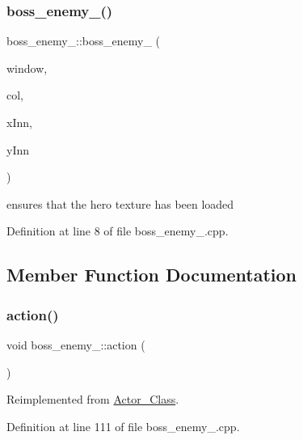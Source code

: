 \subsubsection{\texorpdfstring{boss\+\_\+enemy\+\_()}{boss\_enemy\_2()}}
{\footnotesize\ttfamily boss\+\_\+enemy\+\_\+::boss\+\_\+enemy\+\_ (\begin{DoxyParamCaption}\item[{sf\+::\+Render\+Window \&}]{window,  }\item[{\hyperlink{class_collision}{Collision}}]{col,  }\item[{int}]{x\+Inn,  }\item[{int}]{y\+Inn }\end{DoxyParamCaption})}

ensures that the hero texture has been loaded 

Definition at line 8 of file boss\+\_\+enemy\+\_.\+cpp.



\subsection{Member Function Documentation}
\hypertarget{classboss__enemy__2_a6315561045c1530e588014caaf6a9292}{}\label{classboss__enemy__2_a6315561045c1530e588014caaf6a9292} 
\subsubsection{\texorpdfstring{action()}{action()}}
{\footnotesize\ttfamily void boss\+\_\+enemy\+\_\+::action (\begin{DoxyParamCaption}{ }\end{DoxyParamCaption})\hspace{0.3cm}{\ttfamily [virtual]}}



Reimplemented from \hyperlink{class_actor___class_ab8e23ffae108da3b8eda67c6753bdae0}{Actor\+\_\+\+Class}.



Definition at line 111 of file boss\+\_\+enemy\+\_.\+cpp.

\hypertarget{classboss__enemy__2_a602bdac1d534a3d37e9cd76616216b45}{}\label{classboss__enemy__2_a602bdac1d534a3d37e9cd76616216b45} 
